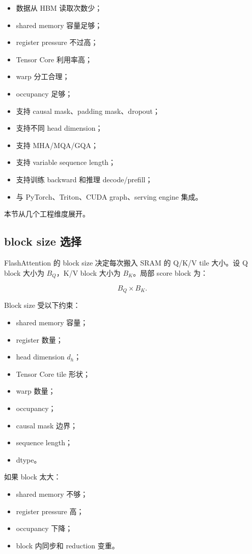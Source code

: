\begin{itemize}
\item 数据从 HBM 读取次数少；
\item shared memory 容量足够；
\item register pressure 不过高；
\item Tensor Core 利用率高；
\item warp 分工合理；
\item occupancy 足够；
\item 支持 causal mask、padding mask、dropout；
\item 支持不同 head dimension；
\item 支持 MHA/MQA/GQA；
\item 支持 variable sequence length；
\item 支持训练 backward 和推理 decode/prefill；
\item 与 PyTorch、Triton、CUDA graph、serving engine 集成。
\end{itemize}

本节从几个工程维度展开。

\subsection{block size 选择}
\label{subsec:flashattention-block-size-choice}

FlashAttention 的 block size 决定每次搬入 SRAM 的 Q/K/V tile 大小。设 Q block 大小为 $B_Q$，K/V block 大小为 $B_K$。局部 score block 为：

\[
B_Q\times B_K.
\]

Block size 受以下约束：

\begin{itemize}
\item shared memory 容量；
\item register 数量；
\item head dimension $d_h$；
\item Tensor Core tile 形状；
\item warp 数量；
\item occupancy；
\item causal mask 边界；
\item sequence length；
\item dtype。
\end{itemize}

如果 block 太大：

\begin{itemize}
\item shared memory 不够；
\item register pressure 高；
\item occupancy 下降；
\item block 内同步和 reduction 变重。
\end{itemize}

